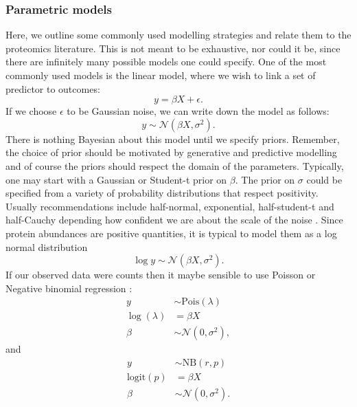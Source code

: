 \documentclass[12pt,english, journal=jpr, layout=twocolumn]{article}
\begin{document}
\subsubsection{Parametric models}
Here, we outline some commonly used modelling strategies and relate them to the proteomics literature. This is not meant to be exhaustive, nor could it be, since there are infinitely many possible models one could specify. One of the most commonly used models is the linear model, where we wish to link a set of predictor to outcomes:
\begin{equation}
y = \beta X + \epsilon.
\end{equation}
If we choose $\epsilon$ to be Gaussian noise, we can write down the model as follows:
\begin{equation}
y \sim \mathcal{N}(\beta X, \sigma^2).
\end{equation}
There is nothing Bayesian about this model until we specify priors. Remember, the choice of prior should be motivated by generative and predictive modelling and of course the priors should respect the domain of the parameters. Typically, one may start with a Gaussian or Student-t prior on $\beta$. The prior on $\sigma$ could be specified from a variety of probability distributions that respect positivity. Usually recommendations include half-normal, exponential, half-student-t and half-Cauchy depending how confident we are about the scale of the noise \citep{Gelman::2017}. Since protein abundances are positive quantities, it is typical to model them as a log normal distribution
\begin{equation}
\log y  \sim \mathcal{N}(\beta X, \sigma^2).
\end{equation}   	
If our observed data were counts then it maybe sensible to use Poisson or Negative binomial regression \citep{Lawless::1987}:
\begin{equation}
\begin{split}
y &\sim \text{Pois}(\lambda)\\
\log(\lambda) &= \beta X\\
\beta &\sim \mathcal{N}(0, \sigma^2),
\end{split}
\end{equation}
and
\begin{equation}
	\begin{split}
		y &\sim \text{NB}(r, p)\\
		\text{logit}(p) &= \beta X\\
		\beta &\sim \mathcal{N}(0, \sigma^2).
	\end{split}
\end{equation}
\end{document}
